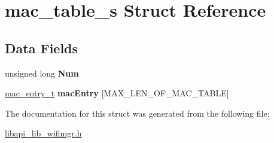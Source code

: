 \hypertarget{structmac__table__s}{}\section{mac\+\_\+table\+\_\+s Struct Reference}
\label{structmac__table__s}
\subsection*{Data Fields}
\begin{DoxyCompactItemize}
\item 
\mbox{\label{structmac__table__s_a9bf8109b57f5377f287559004e667cca}} 
unsigned long {\bfseries Num}
\item 
\mbox{\label{structmac__table__s_afb15c1f32ca4a2e784dfb453c9df4bab}} 
\hyperlink{structmac__entry__s}{mac\+\_\+entry\+\_\+t} {\bfseries mac\+Entry} \mbox{[}M\+A\+X\+\_\+\+L\+E\+N\+\_\+\+O\+F\+\_\+\+M\+A\+C\+\_\+\+T\+A\+B\+LE\mbox{]}
\end{DoxyCompactItemize}


The documentation for this struct was generated from the following file\+:\begin{DoxyCompactItemize}
\item 
\hyperlink{libapi__lib__wifimgr_8h}{libapi\+\_\+lib\+\_\+wifimgr.\+h}\end{DoxyCompactItemize}
